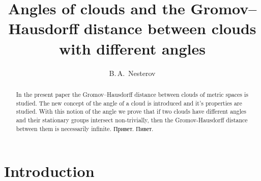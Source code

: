 \documentclass[leqno]{article}
\begin{document}
\title{Angles of clouds and the Gromov--Hausdorff distance between
	clouds with different angles
}
\author{B.\,A.~Nesterov}
\date{}
\maketitle
\begin{abstract}
	In the present paper the Gromov--Hausdorff distance between clouds
	of metric spaces is studied.  The new concept of the angle of a
	cloud is introduced and it's properties are studied. With this
	notion of the angle we prove that if two clouds have different
	angles and their stationary groups intersect non-trivially, then
	the Gromov-Hausdorff distance between them is necessarily
	infinite. Привет. Пивет.
\end{abstract}
\section{Introduction}

\end{document}
